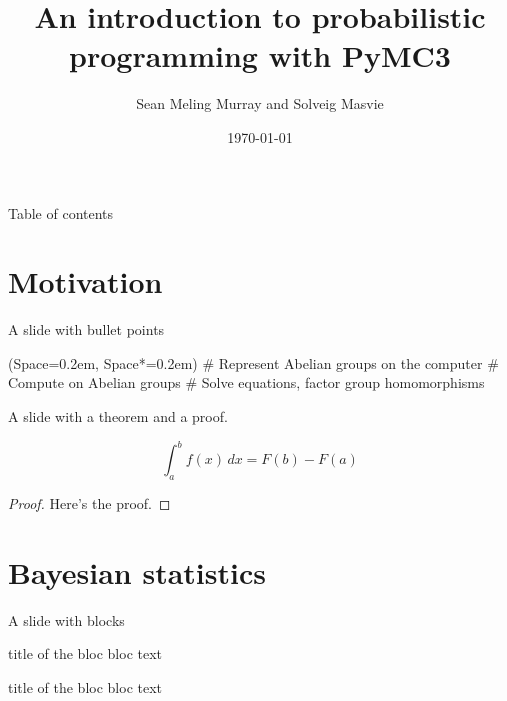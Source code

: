 \documentclass[12pt, aspectratio=149]{beamer}
\title{An introduction to probabilistic programming with PyMC3}
\date{\today}
\author{Sean Meling Murray and Solveig Masvie}
\newcommand{\listSpace}{0.2em}
\theoremstyle{plain}
\begin{document}
\maketitle
{}
  
\begin{frame}{Table of contents}
	\tableofcontents
\end{frame}

\section{Motivation}
\begin{frame}[fragile]{A slide with bullet points}
	\begin{easylist}[itemize]
		\ListProperties(Space=\listSpace, Space*=\listSpace)
		# Represent Abelian groups on the computer
		# Compute on Abelian groups
		# Solve equations, factor group homomorphisms
	\end{easylist}
\end{frame}

\begin{frame}[fragile]{A slide with a theorem and a proof.}
\begin{theorem}[Integral]
	\begin{equation*}
		\int_{a}^{b} f(x) \, dx = F(b) - F(a)
	\end{equation*}
\end{theorem}
\begin{proof}
Here's the proof.
\end{proof}
\end{frame}

\section{Bayesian statistics}
\begin{frame}[fragile]{A slide with blocks}
	\begin{block}{title of the bloc}
	bloc text
	\end{block}
	
	\begin{exampleblock}{title of the bloc}
	bloc text
	\end{exampleblock}
\end{frame}
\end{document}
